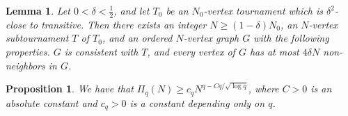 \documentclass[10pt,a4paper]{amsart}
\newtheorem{proposition}{Proposition}
\newtheorem{lemma}{Lemma}
\begin{document}
\begin{lemma}\label{lem:clean degrees}
    Let $0<\delta<\frac 12$, and let $T_0$ be an $N_0$-vertex tournament which is $\delta^2$-close to transitive. Then there exists an integer $N \geq (1-\delta)N_0$, an $N$-vertex subtournament $T$ of $T_0$, and an ordered $N$-vertex graph $G$ with the following properties. $G$ is consistent with $T$, and every vertex of $G$ has at most $4\delta N$ non-neighbors in $G$. 
\end{lemma}

\begin{proposition}\label{prop:T main product}
    We have that $\Pi_q(N) \geq c_q N^{q-Cq/\sqrt{\log q}}$, where $C>0$ is an absolute constant and $c_q>0$ is a constant depending only on $q$.
\end{proposition}
\end{document}
